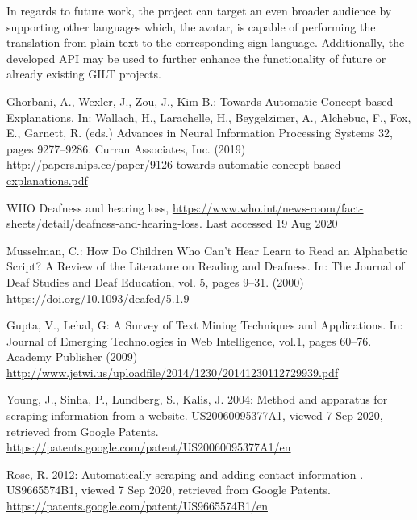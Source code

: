 \documentclass[runningheads]{llncs}
\begin{document}
In regards to future work, the project can target an even broader audience by supporting other languages which, the avatar, is capable of performing the translation from plain text to the corresponding sign language.
Additionally, the developed API may be used to further enhance the functionality of future or already existing GILT projects.


%
%
%
% 
% 
%
\begin{thebibliography}{8}
        Ghorbani, A., Wexler, J., Zou, J., Kim B.: Towards Automatic Concept-based Explanations.
        In: Wallach, H., Larachelle, H., Beygelzimer, A., Alchebuc, F., Fox, E., Garnett, R. (eds.)
        Advances in Neural Information Processing Systems 32, pages 9277--9286. Curran Associates, Inc. (2019)
        \url{http://papers.nips.cc/paper/9126-towards-automatic-concept-based-explanations.pdf}

        WHO Deafness and hearing loss, \url{https://www.who.int/news-room/fact-sheets/detail/deafness-and-hearing-loss}. Last accessed 19 Aug 2020

        Musselman, C.: How Do Children Who Can't Hear Learn to Read an Alphabetic Script? A Review of the Literature on Reading and Deafness.
        In: The Journal of Deaf Studies and Deaf Education, vol. 5, pages 9--31. (2000)
        \url{https://doi.org/10.1093/deafed/5.1.9}

        Gupta, V., Lehal, G: A Survey of Text Mining Techniques and Applications.
        In: Journal of Emerging Technologies in Web Intelligence, vol.1, pages 60--76. Academy Publisher (2009)
        \url{http://www.jetwi.us/uploadfile/2014/1230/20141230112729939.pdf}

        Young, J., Sinha, P., Lundberg, S., Kalis, J. 2004: Method and apparatus for scraping information from a website.
        US20060095377A1, viewed 7 Sep 2020, retrieved from Google Patents.
        \url{https://patents.google.com/patent/US20060095377A1/en}

        Rose, R. 2012: Automatically scraping and adding contact information .
        US9665574B1, viewed 7 Sep 2020, retrieved from Google Patents.
        \url{https://patents.google.com/patent/US9665574B1/en}


\end{thebibliography}
\end{document}
